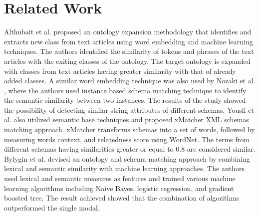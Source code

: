 
\section*{Related Work}
\label{relatedwork}
Althubait et al. \cite{althubaiti2020combining} proposed an ontology expansion methodology that identifies and extracts new class from text articles using word embedding and machine learning techniques. The authors identified the similarity of tokens and phrases of the text articles with the exiting classes of the ontology. The target ontology is expanded with classes from text articles having greater similarity with that of already added classes. A similar word embedding technique was also used by Nozaki et al. \cite{nozaki2019semantic}, where the authors used instance based schema matching technique to identify the semantic similarity between two instances. The results of the study showed the possibility of detecting similar string attributes of different schemas. Yousfi et al. \cite{yousfi2020xmatcher} also utilized semantic base techniques and proposed xMatcher XML schemas matching approach. xMatcher transforms schemas into a set of words, followed by measuring words context, and relatedness score using WordNet. The terms from different schemas having similarities greater or equal to 0.8 are considered similar. 
Bylygin et al. \cite{bulygin2018combining} devised an ontology and schema matching approach by combining lexical and semantic similarity with machine learning approaches.  The authors used lexical and semantic measures as features and trained various machine learning algorithms including Naive Bayes, logistic regression, and gradient boosted tree. The result achieved showed that the combination of algorithms outperformed the single modal.

